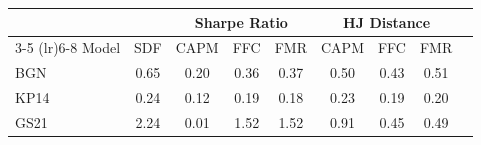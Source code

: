 \begin{tabular}{l c c c c c c c c}
\toprule
& & \multicolumn{3}{c}{Sharpe Ratio} & \multicolumn{3}{c}{HJ Distance} \\
\cmidrule(lr){3-5} \cmidrule(lr){6-8}
Model & SDF & CAPM & FFC & FMR & CAPM & FFC & FMR \\
\midrule
BGN & 0.65 & 0.20 & 0.36 & 0.37 & 0.50 & 0.43 & 0.51 \\
KP14 & 0.24 & 0.12 & 0.19 & 0.18 & 0.23 & 0.19 & 0.20 \\
GS21 & 2.24 & 0.01 & 1.52 & 1.52 & 0.91 & 0.45 & 0.49 \\
\bottomrule
\end{tabular}